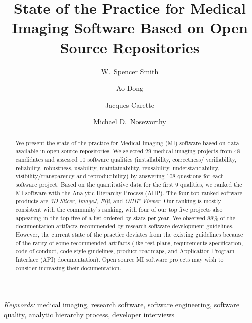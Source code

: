 \documentclass[11pt]{article}
\begin{document}
\title{State of the Practice for Medical Imaging Software Based on Open Source Repositories}

\author[1,*]{W.\ Spencer Smith}
\author[1]{Ao Dong}
\author[1]{Jacques Carette}
\author[2]{Michael D.\ Noseworthy}


\maketitle


\begin{abstract}

We present the state of the practice for Medical Imaging (MI) software based on
data available in open source repositories. We selected 29 medical imaging
projects from 48 candidates and assessed 10 software qualities (installability,
correctness/ verifiability, reliability, robustness, usability, maintainability,
reusability, understandability, visibility/transparency and reproducibility) by
answering 108 questions for each software project. Based on the quantitative
data for the first 9 qualities, we ranked the MI software with the Analytic
Hierarchy Process (AHP). The four top ranked software products are \textit{3D
Slicer}, \textit{ImageJ}, \textit{Fiji}, and \textit{OHIF Viewer}.  Our ranking
is mostly consistent with the community's ranking, with four of our top five
projects also appearing in the top five of a list ordered by stars-per-year.  We
observed 88\% of the documentation artifacts recommended by research software
development guidelines.  However, the current state of the practice deviates
from the existing guidelines because of the rarity of some recommended artifacts
(like test plans, requirements specification, code of conduct, code style
guidelines, product roadmaps, and Application Program Interface (API)
documentation). Open source MI software projects may wish to consider increasing
their documentation.

\end{abstract}

\noindent \emph{Keywords:}
	medical imaging, research software, software engineering, software
	quality, analytic hierarchy process, developer interviews
\end{document}
